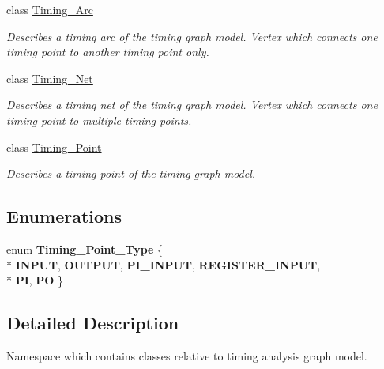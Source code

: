 \begin{DoxyCompactItemize}
class \hyperlink{classTiming__Analysis_1_1Timing__Arc}{Timing\-\_\-\-Arc}
\begin{DoxyCompactList}\small\item\em Describes a timing arc of the timing graph model. Vertex which connects one timing point to another timing point only. \end{DoxyCompactList}\item 
class \hyperlink{classTiming__Analysis_1_1Timing__Net}{Timing\-\_\-\-Net}
\begin{DoxyCompactList}\small\item\em Describes a timing net of the timing graph model. Vertex which connects one timing point to multiple timing points. \end{DoxyCompactList}\item 
class \hyperlink{classTiming__Analysis_1_1Timing__Point}{Timing\-\_\-\-Point}
\begin{DoxyCompactList}\small\item\em Describes a timing point of the timing graph model. \end{DoxyCompactList}\end{DoxyCompactItemize}
\subsection*{Enumerations}
\begin{DoxyCompactItemize}
\item 
enum {\bfseries Timing\-\_\-\-Point\-\_\-\-Type} \{ \\*
{\bfseries I\-N\-P\-U\-T}, 
{\bfseries O\-U\-T\-P\-U\-T}, 
{\bfseries P\-I\-\_\-\-I\-N\-P\-U\-T}, 
{\bfseries R\-E\-G\-I\-S\-T\-E\-R\-\_\-\-I\-N\-P\-U\-T}, 
\\*
{\bfseries P\-I}, 
{\bfseries P\-O}
 \}
\end{DoxyCompactItemize}


\subsection{Detailed Description}
Namespace which contains classes relative to timing analysis graph model. 